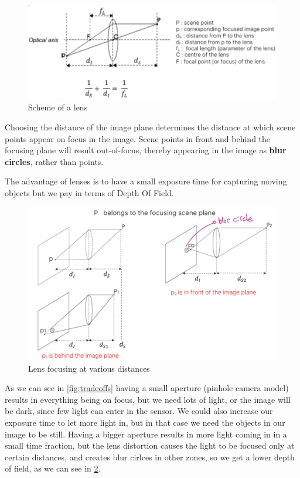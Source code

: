 \begin{figure}[htbp]
  \centering
  \includegraphics[width=0.7\linewidth]{./img/lens.jpg}
  \caption{Scheme of a lens}
  \label{fig:lens}
\end{figure}

Choosing the distance of the image plane determines the distance at which scene points appear on focus in the image.
Scene points in front and behind the focusing plane will result out-of-focus, thereby appearing in the image as \textbf{blur circles}, rather than points.

The advantage of lenses is to have a small exposure time for capturing moving objects but we pay in terms of Depth Of Field.

\begin{figure}[htbp]
  \centering
  \includegraphics[width=0.8\linewidth]{./img/lens_focus.jpg}
  \caption{Lens focusing at various distances}
  \label{fig:lens_focus}
\end{figure}

As we can see in \ref{fig:tradeoffs} having a small aperture (pinhole camera model) results in everything being on focus, but we need lots of light, or the image will be dark, since few light can enter in the sensor.
We could also increase our exposure time to let more light in, but in that case we need the objects in our image to be still.
Having a bigger aperture results in more light coming in in a small time fraction, but the lens distortion causes the light to be focused only at certain distances, and creates blur cirlces in other zones, so we get a lower depth of field, as we can see in \ref{fig:lens_focus}.

